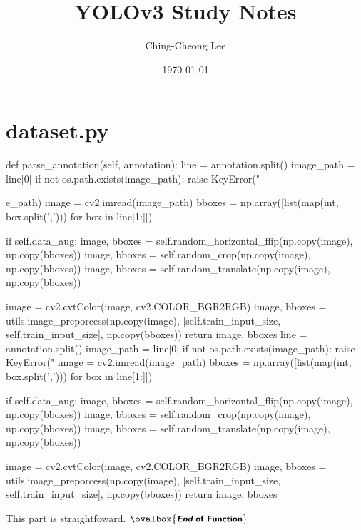 \documentclass[10pt,a4paper]{article}
\title{YOLOv3 Study Notes}
\author{
Ching-Cheong Lee
}
\date{\today}
\newcommand{\END}{\text{}\hfill$\ovalbox{\small\text{\bfseries\sffamily {\itshape End} of Function}}$\bigskip}
\begin{document}
\maketitle
\section{dataset.py}

\begin{py}
def parse_annotation(self, annotation):
    line = annotation.split()
    image_path = line[0]
    if not os.path.exists(image_path):
        raise KeyError("%
        
        e_path)
    image = cv2.imread(image_path)
    bboxes = np.array([list(map(int, box.split(','))) for box in line[1:]])

    if self.data_aug:
        image, bboxes = self.random_horizontal_flip(np.copy(image), np.copy(bboxes))
        image, bboxes = self.random_crop(np.copy(image), np.copy(bboxes))
        image, bboxes = self.random_translate(np.copy(image), np.copy(bboxes))

    image = cv2.cvtColor(image, cv2.COLOR_BGR2RGB)
    image, bboxes = utils.image_preporcess(np.copy(image), [self.train_input_size, self.train_input_size], np.copy(bboxes))
    return image, bboxes
    line = annotation.split()
    image_path = line[0]
    if not os.path.exists(image_path):
        raise KeyError("%
    image = cv2.imread(image_path)
    bboxes = np.array([list(map(int, box.split(','))) for box in line[1:]])

    if self.data_aug:
        image, bboxes = self.random_horizontal_flip(np.copy(image), np.copy(bboxes))
        image, bboxes = self.random_crop(np.copy(image), np.copy(bboxes))
        image, bboxes = self.random_translate(np.copy(image), np.copy(bboxes))

    image = cv2.cvtColor(image, cv2.COLOR_BGR2RGB)
    image, bboxes = utils.image_preporcess(np.copy(image), [self.train_input_size, self.train_input_size], np.copy(bboxes))
    return image, bboxes
\end{py}
This part is straightfoward. \END
\end{document}
